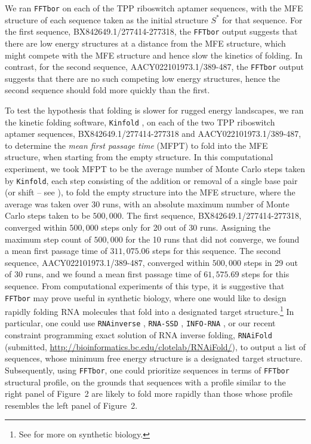 We ran {\tt FFTbor} on each of the TPP riboswitch aptamer
sequences, with the MFE structure of each
sequence taken as the initial structure $S^*$ for that sequence.  For the
first sequence, BX842649.1/277414-277318, the {\tt FFTbor} output
suggests that there are low energy structures
at a distance from the MFE structure, which might compete with the MFE
structure and hence slow the kinetics of folding. In contrast, for the
second sequence, AACY022101973.1/389-487, the {\tt FFTbor} output suggests
that there are no such competing low energy structures, hence
the second sequence should fold more quickly than the first.

To test the hypothesis that folding is slower for rugged energy landscapes,
we ran the kinetic folding software, {\tt Kinfold} \cite{flamm},
on each of the two TPP riboswitch aptamer sequences,
BX842649.1/277414-277318 and AACY022101973.1/389-487,
to determine the {\em mean first passage time} (MFPT) to
fold into the MFE structure, when starting from the empty structure.
In this computational
experiment, we took MFPT to be the average number of Monte Carlo steps
taken by {\tt Kinfold}, each step consisting of the addition or removal
of a single base pair (or shift -- see \cite{flamm}), to fold the
empty structure into the MFE
structure, where the average was taken over $30$ runs, with an absolute
maximum number of Monte Carlo steps taken to be $500,000$.
The first sequence, BX842649.1/277414-277318, converged within $500,000$
steps only for 20 out of 30 runs. Assigning the maximum step count of
$500,000$ for the 10 runs that did not converge, we found a mean first
passage time of $311,075.06$ steps for this sequence.
The second sequence, AACY022101973.1/389-487, converged within $500,000$
steps in 29 out of 30 runs, and we found a mean first passage time of
$61,575.69$ steps for this sequence. From computational experiments of this
type, it is suggestive that {\tt FFTbor} may prove useful in synthetic
biology,
where one would like to design rapidly folding RNA molecules that
fold into a designated target structure.\footnote{See
\cite{Shetty.jbe08,Knight.msb05,Waldminghaus.bc08,Zadeh.jcc11} for more
on synthetic biology.} In particular, one could use
{\tt RNAinverse} \cite{hofacker:ViennaWebServer},
{\tt RNA-SSD} \cite{Andronescu04},
{\tt INFO-RNA} \cite{Busch06},
or our recent constraint programming exact
solution of RNA inverse folding, {\tt RNAiFold}
(submitted, \url{http://bioinformatics.bc.edu/clotelab/RNAiFold/}),
to output a list of sequences,
whose minimum free energy structure is a designated target structure.
Subsequently, using {\tt FFTbor}, one could prioritize sequences in terms
of {\tt FFTbor} structural profile, on the grounds that sequences with a profile
similar to the right panel of Figure~2
are likely to fold more rapidly than those whose profile resembles
the left panel of Figure~2.

